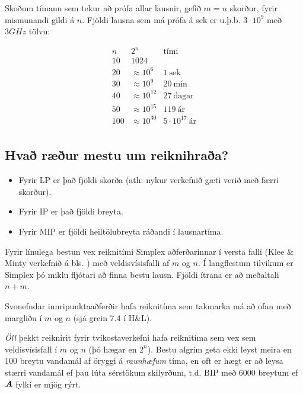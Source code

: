 \begin{daemi}[Veldisvísisvöxtur]Skoðum tímann sem tekur að prófa allar lausnir, gefið $m=n$ skorður, fyrir mismunandi gildi á $n$.
Fjöldi lausna sem má prófa á sek er u.þ.b. $3\cdot10^9$ með $3GHz$ tölvu:
\begin{center}
  \[\begin{array}{cll} n & 2^n & \mbox{tími} \\ \hline 
10 & 1024 \\
20 & \approx10^6 & 1~\mbox{sek}  \\
30 & \approx10^{9} & 20~\mbox{mín}\\
40 & \approx10^{12} & 27~\mbox{dagar}\\
50 & \approx10^{15} & 119~\mbox{ár}\\
100 & \approx10^{30} & 5\cdot10^{17}~\mbox{ár}\\
    \end{array}
\]
\end{center}
\end{daemi}

\subsection*{Hvað ræður mestu um reiknihraða?}
\begin{itemize}
\item Fyrir LP er það fjöldi skorða (ath: nykur verkefnið gæti verið með færri skorður).
\item Fyrir IP er það fjöldi breyta.
\item Fyrir MIP er fjöldi heiltölubreyta ráðandi í lausnartíma.
\end{itemize}

Fyrir línulega bestun vex reiknitími Simplex aðferðarinnar í versta falli (Klee \& Minty verkefnið á bls. \pageref{klee-minty})  með veldisvísisfalli af $m$ og $n$. Í langflestum tilvikum er Simplex þó miklu fljótari að finna bestu lausn. Fjöldi ítrana er að meðaltali $n+m$.

Svonefndar innripunktaaðferðir hafa reiknitíma sem takmarka má að ofan með margliðu í $m$ og $n$ (sjá grein 7.4 í H\&L).

\emph{Öll} þekkt reiknirit fyrir tvíkostaverkefni hafa reiknitíma sem vex sem veldisvísisfall í $m$ og $n$ (þó hægar en $2^n$). %
Bestu algrím geta ekki leyst meira en $100$ breytu vandamál af öryggi á \emph{raunhæfum} tíma, en oft er hægt er að leysa stærri vandamál ef þau lúta sérstökum skilyrðum, t.d. BIP með $6000$ breytum ef ${\mbox{\boldmath$A$}}$ fylki er mjög rýrt.

